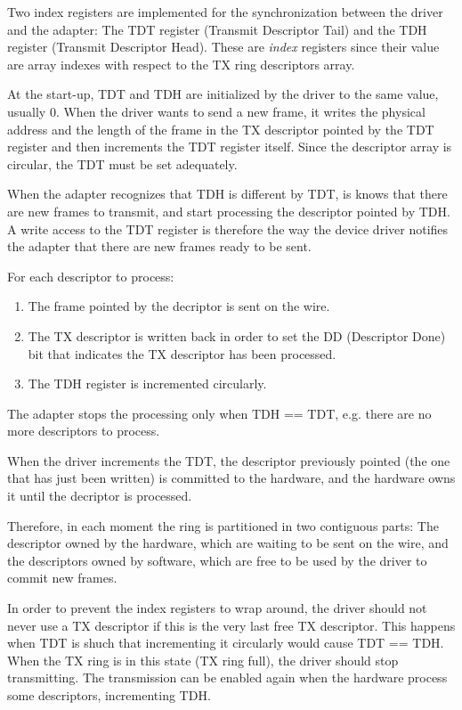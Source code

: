 Two index registers are implemented for the synchronization between the driver and the adapter:
The TDT register (Transmit Descriptor Tail) and the TDH register (Transmit Descriptor Head). These are \emph{index} registers since
their value are array indexes with respect to the TX ring descriptors array.

At the start-up, TDT and TDH are initialized by the driver to the same value, usually 0. When the driver wants to send a new frame,
it writes the physical address and the length of the frame in the TX descriptor pointed by the TDT register and then increments the TDT
register itself. Since the descriptor array is circular, the TDT must be set adequately.

When the adapter recognizes that TDH is different by TDT, is knows that there are new frames to transmit, and start processing the
descriptor pointed by TDH. A write access to the TDT register is therefore the way the device driver notifies the adapter that 
there are new frames ready to be sent.

For each descriptor to process:
\begin{enumerate}
  \item The frame pointed by the decriptor is sent on the wire.
  \item The TX descriptor is written back in order to set the DD (Descriptor Done) bit that indicates the TX descriptor has been
	processed.
  \item The TDH register is incremented circularly.
\end{enumerate}
The adapter stops the processing only when TDH == TDT, e.g. there are no more descriptors to process.

When the driver increments the TDT, the descriptor previously pointed (the one that has just been written) is committed to the hardware,
and the hardware owns it until the decriptor is processed.

Therefore, in each moment the ring is partitioned in two contiguous parts: The descriptor owned by the hardware, which are waiting
to be sent on the wire, and the descriptors owned by software, which are free to be used by the driver to commit new frames.

In order to prevent the index registers to wrap around, the driver should not never use a TX descriptor if this is the very last free
TX descriptor. This happens when TDT is shuch that incrementing it circularly would cause TDT == TDH. When the TX ring is in this
state (TX ring full), the driver should stop transmitting. The transmission can be enabled again when the hardware process some descriptors,
incrementing TDH.

